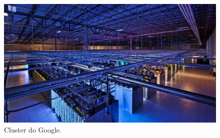 \
\begin{figure}[!htb]
	\centering
	\includegraphics[scale=0.1]{imagens/cluster}
	\caption{Cluster do Google.}
	\label{cluster}
\end{figure}